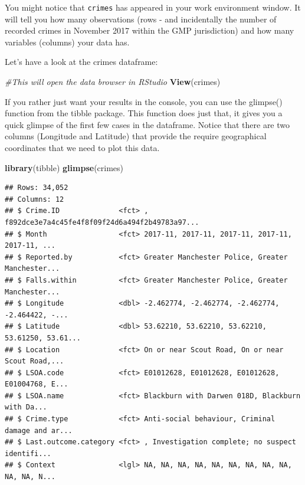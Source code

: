 \documentclass[]{book}
\newenvironment{Shaded}{\begin{snugshade}}{\end{snugshade}}
\newcommand{\CommentTok}[1]{\textcolor[rgb]{0.56,0.35,0.01}{\textit{#1}}}
\newcommand{\KeywordTok}[1]{\textcolor[rgb]{0.13,0.29,0.53}{\textbf{#1}}}
\newcommand{\NormalTok}[1]{#1}
\begin{document}
You might notice that \texttt{crimes} has appeared in your work environment window. It will tell you how many observations (rows - and incidentally the number of recorded crimes in November 2017 within the GMP jurisdiction) and how many variables (columns) your data has.

Let's have a look at the crimes dataframe:

\begin{Shaded}
\begin{Highlighting}[]
\CommentTok{#This will open the data browser in RStudio}
\KeywordTok{View}\NormalTok{(crimes)}
\end{Highlighting}
\end{Shaded}

If you rather just want your results in the console, you can use the glimpse() function from the tibble package. This function does just that, it gives you a quick glimpse of the first few cases in the dataframe. Notice that there are two columns (Longitude and Latitude) that provide the require geographical coordinates that we need to plot this data.

\begin{Shaded}
\begin{Highlighting}[]
\KeywordTok{library}\NormalTok{(tibble)}
\KeywordTok{glimpse}\NormalTok{(crimes)}
\end{Highlighting}
\end{Shaded}

\begin{verbatim}
## Rows: 34,052
## Columns: 12
## $ Crime.ID              <fct> , f892dce3e7a4c45fe4f8f09f24d6a494f2b49783a97...
## $ Month                 <fct> 2017-11, 2017-11, 2017-11, 2017-11, 2017-11, ...
## $ Reported.by           <fct> Greater Manchester Police, Greater Manchester...
## $ Falls.within          <fct> Greater Manchester Police, Greater Manchester...
## $ Longitude             <dbl> -2.462774, -2.462774, -2.462774, -2.464422, -...
## $ Latitude              <dbl> 53.62210, 53.62210, 53.62210, 53.61250, 53.61...
## $ Location              <fct> On or near Scout Road, On or near Scout Road,...
## $ LSOA.code             <fct> E01012628, E01012628, E01012628, E01004768, E...
## $ LSOA.name             <fct> Blackburn with Darwen 018D, Blackburn with Da...
## $ Crime.type            <fct> Anti-social behaviour, Criminal damage and ar...
## $ Last.outcome.category <fct> , Investigation complete; no suspect identifi...
## $ Context               <lgl> NA, NA, NA, NA, NA, NA, NA, NA, NA, NA, NA, N...
\end{verbatim}
\end{document}
